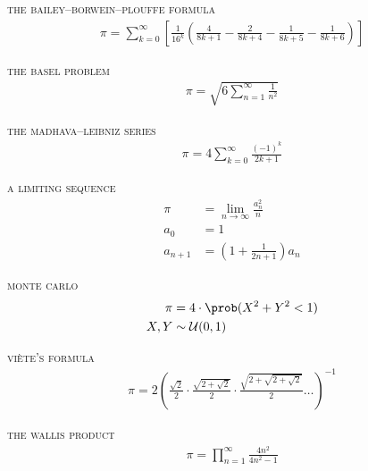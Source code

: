 \documentclass{article}
\begin{document}
\newcommand{\gap}{\vspace{2em}}
\newcommand{\name}[1]{\textsc{\lowercase{#1}}\vspace{0.5em}}

\centering

\name{The Bailey--Borwein--Plouffe formula}
\begin{align*}
    \pi = \sum_{k=0}^\infty
    \left[
        \frac{1}{16^k}
        \left(
        \frac{4}{8k+1} -
        \frac{2}{8k+4} -
        \frac{1}{8k+5} -
        \frac{1}{8k+6}
        \right)
        \right]
\end{align*}

\gap

\name{The Basel problem}
\begin{align*}
    \pi = \sqrt{6 \sum_{n=1}^\infty \frac{1}{n^2}}
\end{align*}

\gap

\name{The Madhava--Leibniz series}
\begin{align*}
    \pi = 4 \sum_{k=0}^\infty \frac{(-1)^k}{2k + 1}
\end{align*}

\gap

\name{A limiting sequence}
\begin{align*}
    \pi     & = \lim_{n \to \infty}\frac{a^2_n}{n}      \\
    a_0     & = 1                                       \\
    a_{n+1} & = \left( 1 + \frac{1}{2n + 1} \right) a_n
\end{align*}

\gap

\name{Monte Carlo}
\begin{align*}
    \pi & = 4 \cdot \prob( X^2 + Y^2 < 1) \\
    X,Y & \sim \mathcal{U}(0,1)
\end{align*}

\gap

\name{Vi\`ete's formula}
\begin{align*}
    \pi = 2 \left(
    \frac{\sqrt{2}}{2} \cdot
    \frac{\sqrt{2 + \sqrt{2}}}{2} \cdot
    \frac{\sqrt{2 + \sqrt{2 + \sqrt{2}}}}{2} \ldots
    \right)^{-1}
\end{align*}

\gap
\name{The Wallis product}
\begin{align*}
    \pi = \prod_{n=1}^\infty \frac{4n^2}{4n^2 - 1}
\end{align*}
\end{document}
